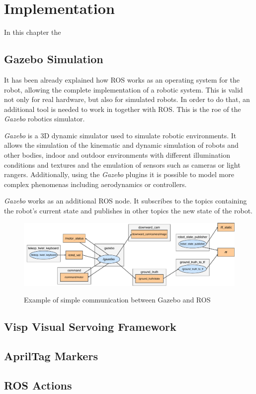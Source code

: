 
\chapter{Implementation}
\label{chap:implementation}

In this chapter the 

\section{Gazebo Simulation}
\label{sec:gazebo-simulation}

It has been already explained how ROS works as an operating system for the robot, allowing the complete implementation of a robotic system. This is valid not only for real hardware, but also for simulated robots. In order to do that, an additional tool is needed to work in together with ROS. This is the roe of the \emph{Gazebo} robotics simulator.

\emph{Gazebo} is a 3D dynamic simulator used to simulate robotic environments. It allows the simulation of the kinematic and dynamic simulation of robots and other bodies, indoor and outdoor environments with different illumination conditions and textures and the emulation of sensors such as cameras or light rangers. Additionally, using the \emph{Gazebo} plugins it is possible to model more complex phenomenas including aerodynamics or controllers.

\emph{Gazebo} works as an additional ROS node. It subscribes to the topics containing the robot's current state and publishes in other topics the new state of the robot. 

\begin{figure}[!htb]
	\caption{Example of simple communication between Gazebo and ROS}
	\centering
	\includegraphics[width=\textwidth]{content/chapter_05/images/gazebo_example.pdf}
	\label{fig:gazebo_example}
\end{figure}

\section{Visp Visual Servoing Framework}
\label{sec:visp}

\section{AprilTag Markers}
\label{sec:apriltag_markers}

\section{ROS Actions}
\label{sec:ros_actions}
